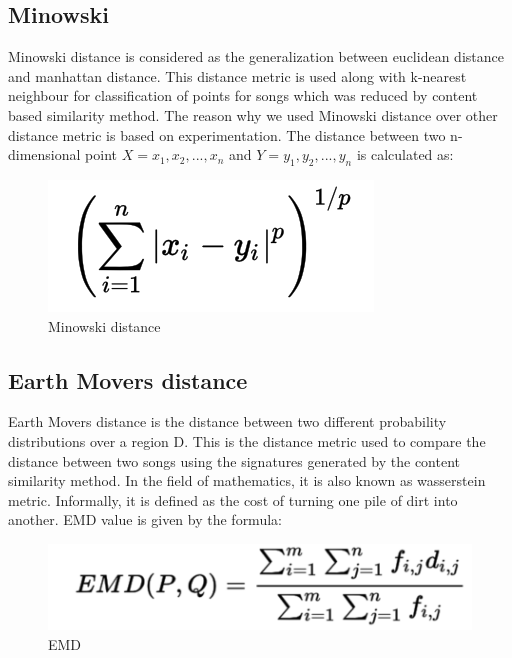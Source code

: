 \documentclass[12pt]{article}
\begin{document}
\subsection{Minowski}
Minowski distance is considered as the generalization between euclidean distance and manhattan distance. This distance metric is used along with k-nearest neighbour for classification of points for songs which was reduced by content based similarity method. The reason why we used Minowski distance over other distance metric is based on experimentation. The distance between two n-dimensional point $ X = {x_1,x_2,...,x_n}$ and $ Y = {y_1,y_2,...,y_n} $ is calculated as:
\begin{figure}[h]\label{kmeans}
\center
\includegraphics{fig3.png}
\caption{Minowski distance}
\end{figure}
\subsection{Earth Movers distance}
Earth Movers distance is the distance between two different probability distributions over a region D. This is the distance metric used to compare the distance between two songs using the signatures generated by the content similarity method. In the field of mathematics, it is also known as wasserstein metric. Informally, it is defined as the cost of turning one pile of dirt into another. EMD value is given by the formula:
\begin{figure}[h]\label{emd}
\center
\includegraphics[scale=0.5]{emd.png}
\caption{EMD}
\end{figure}
\end{document}
